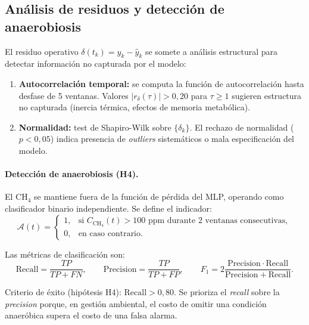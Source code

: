 \subsection{Análisis de residuos y detección de anaerobiosis}
\label{subsec:cap5_residuos_anaerobiosis}

El residuo operativo $\delta(t_k) = y_k - \hat{y}_k$ se somete a análisis estructural para detectar información no capturada por el modelo:

\begin{enumerate}
    \item \textbf{Autocorrelación temporal:} se computa la función de autocorrelación hasta desfase de 5 ventanas. Valores $|r_{\delta}(\tau)| > 0{,}20$ para $\tau \geq 1$ sugieren estructura no capturada (inercia térmica, efectos de memoria metabólica).
    \item \textbf{Normalidad:} test de Shapiro-Wilk sobre $\{\delta_k\}$. El rechazo de normalidad ($p < 0{,}05$) indica presencia de \textit{outliers} sistemáticos o mala especificación del modelo.
\end{enumerate}

\paragraph{Detección de anaerobiosis (H4).} El CH$_4$ se mantiene fuera de la función de pérdida del MLP, operando como clasificador binario independiente. Se define el indicador:
\begin{equation}
\mathcal{A}(t) = 
\begin{cases}
1, & \text{si } C_{\mathrm{CH_4}}(t) > 100 \text{ ppm durante 2 ventanas consecutivas}, \\
0, & \text{en caso contrario}.
\end{cases}
\label{eq:indicador_anaerobiosis}
\end{equation}

Las métricas de clasificación son:
\begin{equation}
\mathrm{Recall} = \frac{TP}{TP + FN}, \qquad
\mathrm{Precision} = \frac{TP}{TP + FP}, \qquad
F_1 = 2\frac{\mathrm{Precision} \cdot \mathrm{Recall}}{\mathrm{Precision} + \mathrm{Recall}}.
\label{eq:metricas_clasificacion}
\end{equation}

Criterio de éxito (hipótesis H4): $\mathrm{Recall} > 0{,}80$. Se prioriza el \textit{recall} sobre la \textit{precision} porque, en gestión ambiental, el costo de omitir una condición anaeróbica supera el costo de una falsa alarma.

